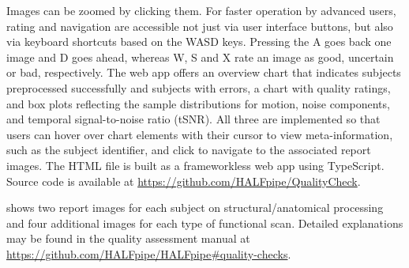 Images can be zoomed by clicking them. For faster operation by advanced
users, rating and navigation are accessible not just via user interface
buttons, but also via keyboard shortcuts based on the WASD keys. Pressing
the A goes back one image and D goes ahead, whereas W, S and X rate an
image as good, uncertain or bad, respectively. The web app offers an
overview chart that indicates subjects preprocessed successfully and
subjects with errors, a chart with quality ratings, and box plots
reflecting the sample distributions for motion, noise components, and
temporal signal-to-noise ratio (tSNR). All three are implemented so that
users can hover over chart elements with their cursor to view
meta-information, such as the subject identifier, and click to navigate to
the associated report images. The HTML file is built as a frameworkless web
app using TypeScript. Source code is available at
\url{https://github.com/HALFpipe/QualityCheck}.

 shows two report images for each subject on
structural/anatomical processing and four additional images for each type
of functional scan. Detailed explanations may be found in the quality
assessment manual at
\url{https://github.com/HALFpipe/HALFpipe\#quality-checks}.

